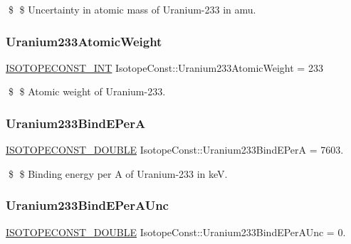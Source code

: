 \$ \$ Uncertainty in atomic mass of Uranium-\/233 in amu. \mbox{\label{group___isotope_const-_uranium-_u233_ga117e007cf3c29ecd4a46f5e7b6815d5c}} 
\subsubsection{\texorpdfstring{Uranium233\+Atomic\+Weight}{Uranium233AtomicWeight}}
{\footnotesize\ttfamily \mbox{\hyperlink{group___isotope_const-_macros_ga5f18360b3e99483a35c32d789e62621c}{I\+S\+O\+T\+O\+P\+E\+C\+O\+N\+S\+T\+\_\+\+I\+NT}} Isotope\+Const\+::\+Uranium233\+Atomic\+Weight = 233}

\$ \$ Atomic weight of Uranium-\/233. \mbox{\label{group___isotope_const-_uranium-_u233_gad4b8d53e99e329dfc62a80288b85a465}} 
\subsubsection{\texorpdfstring{Uranium233\+Bind\+E\+PerA}{Uranium233BindEPerA}}
{\footnotesize\ttfamily \mbox{\hyperlink{group___isotope_const-_macros_ga8f45a7272ce02c0b4c65c44636ed719a}{I\+S\+O\+T\+O\+P\+E\+C\+O\+N\+S\+T\+\_\+\+D\+O\+U\+B\+LE}} Isotope\+Const\+::\+Uranium233\+Bind\+E\+PerA = 7603.}

\$ \$ Binding energy per A of Uranium-\/233 in keV. \mbox{\label{group___isotope_const-_uranium-_u233_ga1334ae72bfe3bc902251e803264be846}} 
\subsubsection{\texorpdfstring{Uranium233\+Bind\+E\+Per\+A\+Unc}{Uranium233BindEPerAUnc}}
{\footnotesize\ttfamily \mbox{\hyperlink{group___isotope_const-_macros_ga8f45a7272ce02c0b4c65c44636ed719a}{I\+S\+O\+T\+O\+P\+E\+C\+O\+N\+S\+T\+\_\+\+D\+O\+U\+B\+LE}} Isotope\+Const\+::\+Uranium233\+Bind\+E\+Per\+A\+Unc = 0.}

